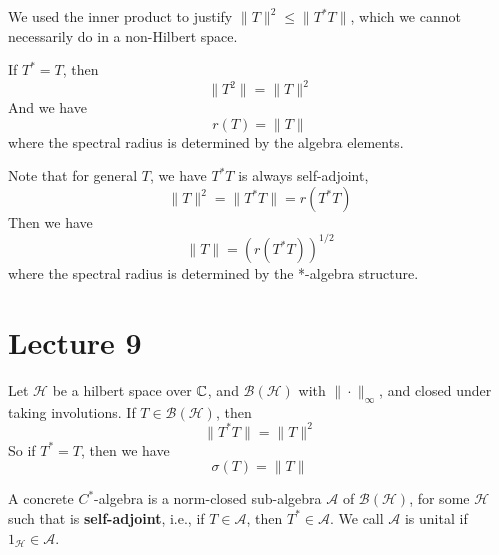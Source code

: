 \begin{note}
    We used the inner product to justify $\|T\|^2\leq\|T^*T\|$, which we cannot necessarily do in a non-Hilbert space.
\end{note}
\begin{corollary}
    If $T^*=T$, then
    \begin{equation*}
        \|T^2\|=\|T\|^2
    \end{equation*}
    And we have
    \begin{equation*}
        r(T)=\|T\|
    \end{equation*}
    where the spectral radius is determined by the algebra elements.
\end{corollary}

Note that for general $T$, we have  $T^*T$ is always self-adjoint,
\begin{equation*}
    \|T\|^2=\|T^*T\|=r(T^*T)
\end{equation*}
Then we have
\begin{equation*}
    \|T\|=(r(T^*T))^{1/2}
\end{equation*}
where the spectral radius is determined by the *-algebra structure.


\section{Lecture 9}
Let $\mathcal{H}$ be a hilbert space over $\mathbb{C}$, and $\mathcal{B}(\mathcal{H})$ with $\|\cdot\|_\infty$, and closed under taking involutions. If $T\in\mathcal{B}(\mathcal{H})$, then
\begin{equation*}
    \|T^*T\|=\|T\|^2
\end{equation*}
So if $T^*=T$, then we have
\begin{equation*}
    \sigma(T)=\|T\|
\end{equation*}

\begin{definition}
    A concrete $C^*$-algebra is a norm-closed sub-algebra $\mathcal{A}$ of $\mathcal{B}(\mathcal{H})$, for some $\mathcal{H}$ such that is \textbf{self-adjoint}, i.e., if $T\in\mathcal{A}$, then $T^*\in\mathcal{A}$. We call $\mathcal{A}$ is unital if $1_\mathcal{H}\in\mathcal{A}$. 
\end{definition}

